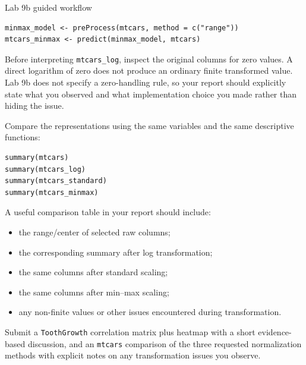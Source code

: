 \begin{labproject}{Lab 9b guided workflow}
\begin{lstlisting}[style=dsr]
minmax_model <- preProcess(mtcars, method = c("range"))
mtcars_minmax <- predict(minmax_model, mtcars)
\end{lstlisting}

\begin{pitfall}
Before interpreting \texttt{mtcars\_log}, inspect the original columns for zero values. A direct logarithm of zero does not produce an ordinary finite transformed value. Lab 9b does not specify a zero-handling rule, so your report should explicitly state what you observed and what implementation choice you made rather than hiding the issue.
\end{pitfall}

Compare the representations using the same variables and the same descriptive functions:

\begin{lstlisting}[style=dsr]
summary(mtcars)
summary(mtcars_log)
summary(mtcars_standard)
summary(mtcars_minmax)
\end{lstlisting}

A useful comparison table in your report should include:
\begin{itemize}
  \item the range/center of selected raw columns;
  \item the corresponding summary after log transformation;
  \item the same columns after standard scaling;
  \item the same columns after min--max scaling;
  \item any non-finite values or other issues encountered during transformation.
\end{itemize}
\end{labproject}

\begin{labdeliverable}
Submit a \texttt{ToothGrowth} correlation matrix plus heatmap with a short evidence-based discussion, and an \texttt{mtcars} comparison of the three requested normalization methods with explicit notes on any transformation issues you observe.
\end{labdeliverable}
